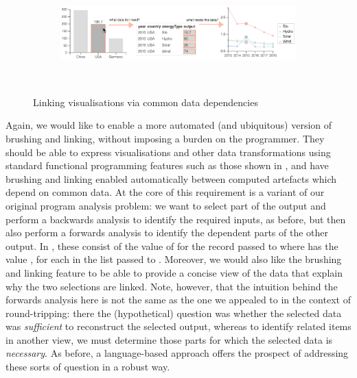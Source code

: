 \begin{figure}
  \begin{subfigure}[b]{0.99\textwidth}
     \centering
     {\includegraphics[scale=0.58]{fig/example/vis-linking.png}}
  \end{subfigure}\\[2mm]
  \begin{subfigure}{0.8\textwidth}
     \small
     
  \end{subfigure}
   \caption{Linking visualisations via common data dependencies}
   \label{fig:introduction:vis-linking}
\end{figure}

Again, we would like to enable a more automated (and ubiquitous) version of brushing and linking, without imposing a burden on the programmer. They should be able to express visualisations and other data transformations using standard functional programming features such as those shown in , and have brushing and linking enabled automatically between computed artefacts which depend on common data. At the core of this requirement is a variant of our original program analysis problem: we want to select part of the output and perform a backwards analysis to identify the required inputs, as before, but then also perform a forwards analysis to identify the dependent parts of the other output. In , these consist of the value of  for the record passed to  where  has the value , for each  in the list passed to . Moreover, we would also like the brushing and linking feature to be able to provide a concise view of the data that explain why the two selections are linked. Note, however, that the intuition behind the forwards analysis here is not the same as the one we appealed to in the context of round-tripping: there the (hypothetical) question was whether the selected data was \emph{sufficient} to reconstruct the selected output, whereas to identify related items in another view, we must determine those parts for which the selected data is \emph{necessary}. As before, a language-based approach offers the prospect of addressing these sorts of question in a robust way.

